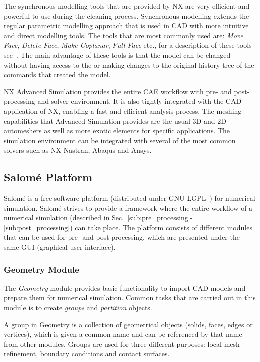 The synchronous modelling tools that are provided by NX are very efficient and powerful to use during the cleaning process. Synchronous modelling extends the regular parametric modelling approach that is used in CAD with more intuitive and direct modelling tools. The tools that are most commonly used are: \textit{Move Face}, \textit{Delete Face}, \textit{Make Coplanar}, \textit{Pull Face} etc., for a description of these tools see~\cite{goncharov14}. The main advantage of these tools is that the model can be changed without having access to the or making changes to the original history-tree of the commands that created the model.

NX Advanced Simulation provides the entire CAE workflow with pre- and post-processing and solver environment. It is also tightly integrated with the CAD application of NX, enabling a fast and efficient analysis process. The meshing capabilities that Advanced Simulation provides are the usual 3D and 2D automeshers as well as more exotic elements for specific applications. The simulation environment can be integrated with several of the most common solvers such as NX Nastran, Abaqus and Ansys.

\subsection{Salomé Platform} %
\label{sec:salom_platform}
Salomé is a free software platform (distributed under GNU LGPL~\cite{lgpl}) for numerical simulation. Salomé strives to provide a framework where the entire workflow of a numerical simulation (described in Sec.~\ref{sub:pre_processing}-\ref{sub:post_processing}) can take place. The platform consists of different modules that can be used for pre- and post-processing, which are presented under the same GUI (graphical user interface).~\cite{ribes07} 

\subsubsection{Geometry Module} %
\label{ssub:geometry_module}
The \textit{Geometry} module provides basic functionality to import CAD models and prepare them for numerical simulation. Common tasks that are carried out in this module is to create \textit{groups} and \textit{partition} objects.

A group in Geometry is a collection of geometrical objects (solids, faces, edges or vertices), which is given a common name and can be referenced by that name from other modules. Groups are used for three different purposes: local mesh refinement, boundary conditions and contact surfaces.

